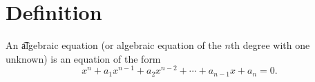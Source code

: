 
\section*{Definition}

An \t{algebraic equation} (or algebraic equation of the $n$th degree with one unknown) is an equation of the form
\[
x^n + a_1 x^{n-1} + a_2x^{n-2} + \cdots + a_{n-1}x + a_n = 0.
\]

\blankpage
